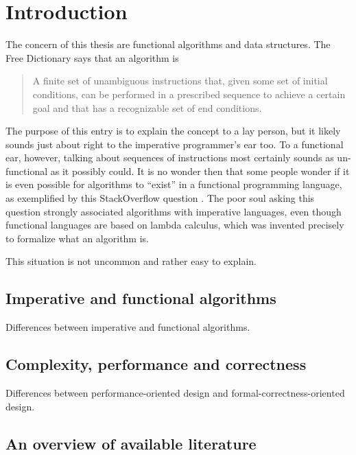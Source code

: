 \documentclass[declaration,mgr,english,shortabstract]{iithesis}
\author         {Wojciech Kołowski}
\date           {Czerwiec '20 chyba że koronawirus}                     %
\begin{document}

\chapter{Introduction} \label{ch1}

The concern of this thesis are functional algorithms and data structures. The Free Dictionary says \cite{TheFreeDictionary} that an algorithm is

\begin{quote}
    A finite set of unambiguous instructions that, given some set of initial conditions, can be performed in a prescribed sequence to achieve a certain goal and that has a recognizable set of end conditions.
\end{quote}

The purpose of this entry is to explain the concept to a lay person, but it likely sounds just about right to the imperative programmer's ear too. To a functional ear, however, talking about sequences of instructions most certainly sounds as un-functional as it possibly could. It is no wonder then that some people wonder if it is even possible for algorithms to ``exist'' in a functional programming language, as exemplified by this StackOverflow question \cite{SO}. The poor soul asking this question strongly associated algorithms with imperative languages, even though functional languages are based on lambda calculus, which was invented precisely to formalize what an algorithm is.

This situation is not uncommon and rather easy to explain.

\section{Imperative and functional algorithms}

Differences between imperative and functional algorithms.

\section{Complexity, performance and correctness}

Differences between performance-oriented design and formal-correctness-oriented design.

\section{An overview of available literature}
\end{document}
